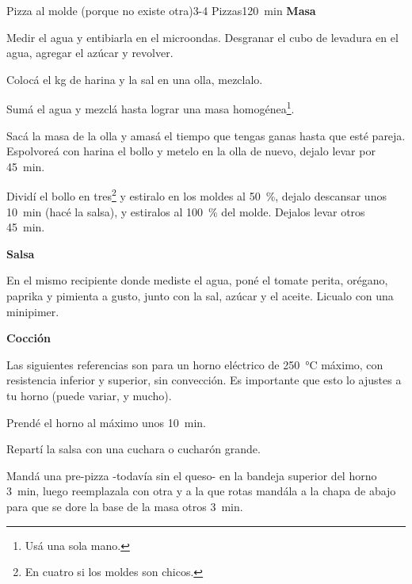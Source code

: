 \documentclass[a4paper]{article}
\begin{document}
\begin{recipe}{Pizza al molde (porque no existe otra)}{3-4 Pizzas}{\SI{120}{\minute}}
  \textbf{Masa}

  Medir el agua y entibiarla en el microondas. Desgranar el cubo de levadura en el agua, agregar el azúcar y revolver.

  Colocá el kg de harina y la sal en una olla, mezclalo.

  Sumá el agua y mezclá hasta lograr una masa homogénea\footnote{Usá una sola mano.}.

  Sacá la masa de la olla y amasá el tiempo que tengas ganas hasta que esté pareja. Espolvoreá con harina el bollo y metelo en la olla de nuevo, dejalo levar por \SI{45}{\minute}.

  Dividí el bollo en tres\footnote{En cuatro si los moldes son chicos.} y estiralo en los moldes al \SI{50}{\percent}, dejalo descansar unos \SI{10}{\minute} (hacé la salsa), y estiralos al \SI{100}{\percent} del molde. Dejalos levar otros \SI{45}{\minute}.


  \textbf{Salsa}

  En el mismo recipiente donde mediste el agua, poné el tomate perita, orégano, paprika y pimienta a gusto, junto con la sal, azúcar y el aceite. Licualo con una minipimer.

  \textbf{Cocción}
  
  Las siguientes referencias son para un horno eléctrico de \SI{250}{\celsius} máximo, con resistencia inferior y superior, sin convección. Es importante que esto lo ajustes a tu horno (puede variar, y mucho).

  Prendé el horno al máximo unos \SI{10}{\minute}.
  
  Repartí la salsa con una cuchara o cucharón grande.
  
  Mandá una pre-pizza -todavía sin el queso- en la bandeja superior del horno \SI{3}{\minute}, luego reemplazala con otra y a la que rotas mandála a la chapa de abajo para que se dore la base de la masa otros \SI{3}{\minute}.
  

\end{recipe}
\end{document}
